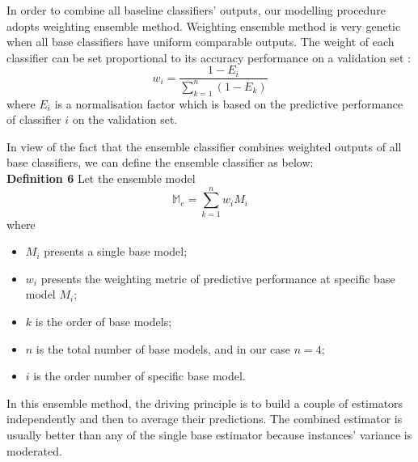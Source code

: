\documentclass[10pt,journal,compsoc]{IEEEtran}
\begin{document}
In order to combine all baseline classifiers' outputs, our modelling procedure adopts weighting ensemble method. Weighting ensemble method is very genetic when all base classifiers have uniform comparable outputs. The weight of each classifier can be set proportional to its accuracy performance on a validation set \cite{Rokach}:\\
\begin{equation}\label{reio}
	w_{i} = \frac{1 - E_{i} }{\sum_{k = 1}^{n} (1 - E_{k}) } 
\end{equation}
where $E_{i} $ is a normalisation factor which is based on the predictive performance of classifier $i$ on the validation set. 

In view of the fact that the ensemble classifier combines weighted outputs of all base classifiers, we can define the ensemble classifier as below: \\
\textbf{Definition 6} Let the ensemble model \\
\begin{equation}\label{reio}
	\mathbb{M}_{e} = \sum_{k = 1}^{n} w_{i} M_{i} 
\end{equation}
where
\begin{itemize}
  \item $M_{i}$ presents a single base model;
  \item $w_{i}$ presents the weighting metric of predictive performance at specific base model $M_{i}$;
  \item $k$ is the order of base models;
  \item $n$ is the total number of base models, and in our case $n = 4$;
  \item $i$ is the order number of specific base model.\\
\end{itemize}

In this ensemble method, the driving principle is to build a couple of estimators independently and then to average their predictions. The combined estimator is usually better than any of the single base estimator because instances' variance is moderated.
\end{document}
